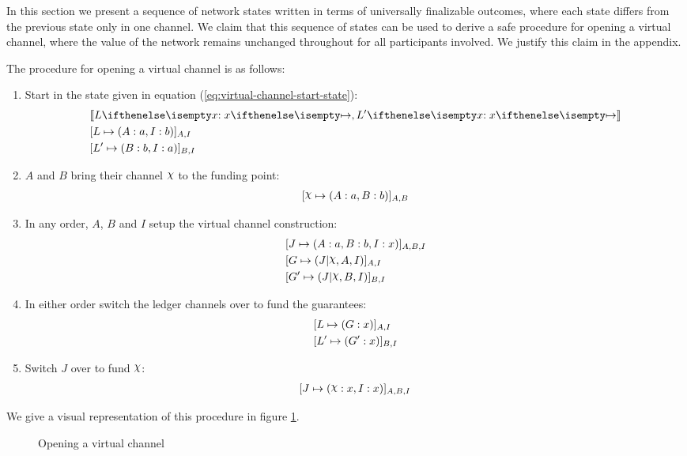 In this section we present a sequence of network states written in terms of universally finalizable outcomes, where each state differs from the previous state only in one channel.
We claim that this sequence of states can be used to derive a safe procedure for opening a virtual channel, where the value of the network remains unchanged throughout for all participants involved.
We justify this claim in the appendix.

The procedure for opening a virtual channel is as follows:
\begin{enumerate}
  \item Start in the state given in equation (\ref{eq:virtual-channel-start-state}):
  \begin{align}
    & \adj{\holds{L}{x}{}, \holds{L'}{x}{}}\\
    & \finalizable{L}{\alloc{A:a, I:b}}{A, I} \\
    & \finalizable{L'}{\alloc{B: b, I: a}}{B, I}
  \end{align}
  \item $A$ and $B$ bring their channel $\rchi$ to the funding point:
  \begin{align}
    \finalizable{\rchi}{\alloc{A:a, B:b}}{A,B}
  \end{align}
  \item In any order, $A$, $B$ and $I$ setup the virtual channel construction:
  \begin{align}
    & \finalizable{J}{\alloc{A:a, B:b, I: x}}{A, B, I} \\
    & \finalizable{G}{\guar{J}{\rchi, A, I}}{A, I} \\
    & \finalizable{G'}{\guar{J}{\rchi, B, I}}{B, I}
  \end{align}
  \item In either order switch the ledger channels over to fund the guarantees:
  \begin{align}
    & [L \mapsto ( G: x )]_{A,I} \\
    & [L' \mapsto ( G': x )]_{B,I}
  \end{align}
  \item Switch $J$ over to fund $\rchi$:
  \begin{align}
    \finalizable{J}{\alloc{\rchi: x, I: x}}{A, B, I}
  \end{align}
\end{enumerate}
We give a visual representation of this procedure in figure \ref{fig:virtual-channel-opening}.

\begin{figure}[ht]
  \centering
  
  \caption{Opening a virtual channel}
  \label{fig:virtual-channel-opening}
\end{figure}


